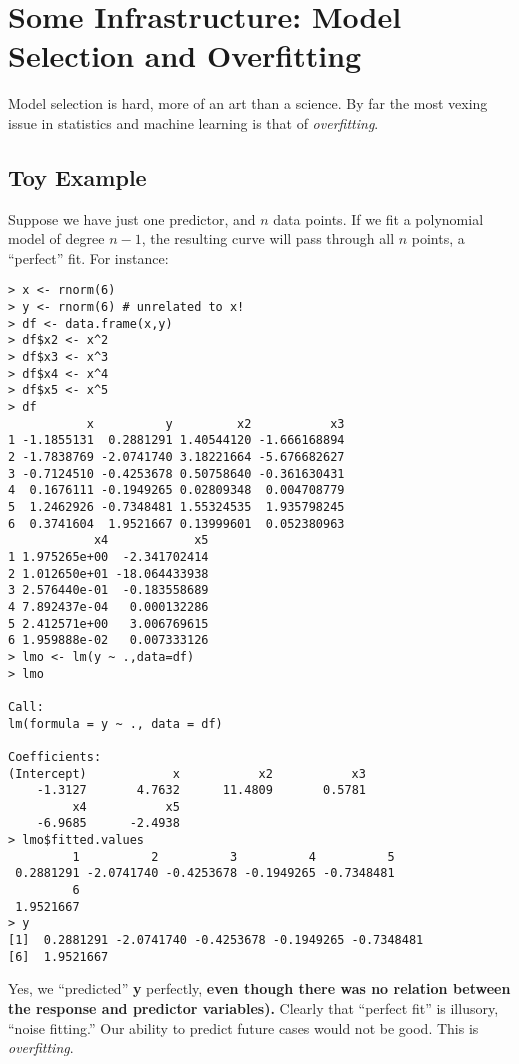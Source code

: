 \chapter{Some Infrastructure: Model Selection and Overfitting}  
\label{chap:overfit}  

Model selection is hard, more of an art than a science.  By far the most
vexing issue in statistics and machine learning is that of
\textit{overfitting}.  

\section{Toy Example}
\label{norelation}

Suppose we have just one predictor, and $n$ data points.  If we fit a
polynomial model of degree $n-1$, the resulting curve will pass through
all $n$ points, a ``perfect'' fit.  For instance:

\begin{lstlisting}
> x <- rnorm(6) 
> y <- rnorm(6) # unrelated to x!
> df <- data.frame(x,y) 
> df$x2 <- x^2 
> df$x3 <- x^3 
> df$x4 <- x^4 
> df$x5 <- x^5 
> df
           x          y         x2           x3
1 -1.1855131  0.2881291 1.40544120 -1.666168894
2 -1.7838769 -2.0741740 3.18221664 -5.676682627
3 -0.7124510 -0.4253678 0.50758640 -0.361630431
4  0.1676111 -0.1949265 0.02809348  0.004708779
5  1.2462926 -0.7348481 1.55324535  1.935798245
6  0.3741604  1.9521667 0.13999601  0.052380963
            x4            x5
1 1.975265e+00  -2.341702414
2 1.012650e+01 -18.064433938
3 2.576440e-01  -0.183558689
4 7.892437e-04   0.000132286
5 2.412571e+00   3.006769615
6 1.959888e-02   0.007333126
> lmo <- lm(y ~ .,data=df) 
> lmo

Call:
lm(formula = y ~ ., data = df)

Coefficients:
(Intercept)            x           x2           x3  
    -1.3127       4.7632      11.4809       0.5781  
         x4           x5  
    -6.9685      -2.4938  
> lmo$fitted.values 
         1          2          3          4          5 
 0.2881291 -2.0741740 -0.4253678 -0.1949265 -0.7348481 
         6 
 1.9521667 
> y
[1]  0.2881291 -2.0741740 -0.4253678 -0.1949265 -0.7348481
[6]  1.9521667
\end{lstlisting}

Yes, we ``predicted'' \textbf{y} perfectly, \textbf{even though there
was no relation between the response and predictor variables).}
Clearly that ``perfect fit'' is illusory, ``noise fitting.''  Our
ability to predict future cases would not be good.  This is
\textit{overfitting}.

